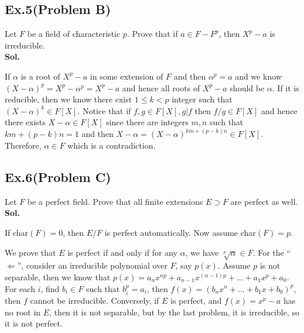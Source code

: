 \documentclass[lang=en,11pt,a4paper,citestyle =authoryear]{elegantpaper}
\begin{document}
\subsection*{Ex.5(Problem B)}\vspace{0.5em}
Let $F$ be a field of characteristic $p$. Prove that if $ a\in  F - F^p$, then
$X^p - a$ is irreducible.
\vspace{0.5em}\\
\textbf{Sol.} \par
   If $\alpha$ is a root of $X^p - a$ in some extension of $F$ and then $\alpha^p = a$ and we know $(X-\alpha)^p = X^p -\alpha^p = X^p - a$ and hence all roots of $X^p - a$ should be $\alpha$. If it is reducible, then we know there exist $1\leq k<p$ integer such that $(X-\alpha)^k \in F[X]$. Notice that if $f,g\in F[X], g|f$ then $f/g \in F[X]$ and hence there exists $X-\alpha \in F[X]$ since there are integers $m,n$ such that $km+(p-k)n = 1$ and then $X-\alpha = (X-\alpha)^{km+(p-k)n}\in F[X]$. Therefore, $\alpha \in F$ which is a contradiction.
\par 
\vspace{0.5em}

\subsection*{Ex.6(Problem C)}
Let $F$ be a perfect field. Prove that all finite extensions $E \supset F$ are perfect as well.
\vspace{0.5em}\\
\textbf{Sol.} \par
\iffalse
If char$(F)=0$, then $E/F$ is perfect automatically. Now assume char$(F)=p$. 

We prove that $E$ is perfect if and only if for any $\alpha$, we have $\sqrt[p]{\alpha}\in F$. For the ``$\Leftarrow$'', consider an irreducible polynomial over $F$, say $p(x)$. Assume $p$ is not separable, then we know that $p(x)=a_nx^{np}+a_{n-1}x^{(n-1)p}+\dots+a_1x^p+a_0$. For each $i$, find $b_i\in F$ such that $b_i^p=a_i$, then $f(x)=(b_nx^n+\dots+b_1x+b_0)^p$, then $f$ cannot be irreducible. 
Conversely, if $E$ is perfect, and $f(x)=x^p-a$ has no root in $E$, then it is not separable, but by the last problem, it is irreducible, so it is not perfect.
\end{document}
